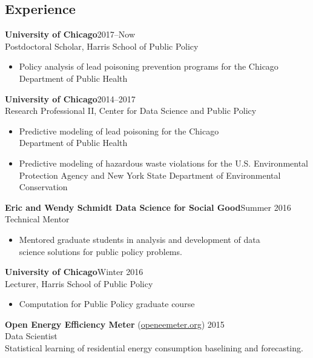 \documentclass[margin,line]{resume}
\begin{document}
\address{epotash@uchicago.edu / \href{http://www.k2co3.net}{k2co3.net} / \href{https://github.com/potash}{github.com/potash}}
\begin{resume}
\section{\mysidestyle Experience}
	{\bf University of Chicago}\hfill{2017--Now}\\
	Postdoctoral Scholar, Harris School of Public Policy
	\begin{itemize}
		\item Policy analysis of lead poisoning prevention programs for the Chicago\\Department of Public Health
	\end{itemize}

	{\bf University of Chicago}\hfill{2014--2017}\\
	Research Professional II, Center for Data Science and Public Policy
	\begin{itemize}
		\item Predictive modeling of lead poisoning for the Chicago\\Department of Public Health
		\item Predictive modeling of hazardous waste violations for the U.S. Environmental\\ Protection Agency and New York State Department of Environmental\\ Conservation
	\end{itemize}

        {\bf Eric and Wendy Schmidt Data Science for Social Good}\hfill{Summer 2016}\\
	Technical Mentor
	\begin{itemize}
		\item Mentored graduate students in analysis and development of data\\science solutions for public policy problems.
	\end{itemize}


        {\bf University of Chicago}\hfill{Winter 2016}\\
        Lecturer, Harris School of Public Policy
	\begin{itemize}
		\item Computation for Public Policy graduate course
	\end{itemize}

	{\bf Open Energy Efficiency Meter} (\href{http://www.openeemeter.org/}{openeemeter.org}) \hfill {2015} \\
	Data Scientist \\
	Statistical learning of residential energy consumption baselining and forecasting.


\end{resume}
\end{document}
